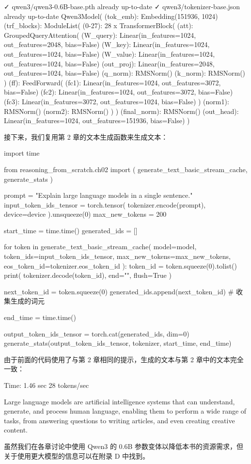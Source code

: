 \begin{codebox}
✓ qwen3/qwen3-0.6B-base.pth already up-to-date
✓ qwen3/tokenizer-base.json already up-to-date
Qwen3Model(
  (tok_emb): Embedding(151936, 1024)
  (trf_blocks): ModuleList(
    (0-27): 28 x TransformerBlock(
      (att): GroupedQueryAttention(
        (W_query): Linear(in_features=1024, out_features=2048, bias=False)
        (W_key): Linear(in_features=1024, out_features=1024, bias=False)
        (W_value): Linear(in_features=1024, out_features=1024, bias=False)
        (out_proj): Linear(in_features=2048, out_features=1024, bias=False)
        (q_norm): RMSNorm()
        (k_norm): RMSNorm()
      )
      (ff): FeedForward(
        (fc1): Linear(in_features=1024, out_features=3072, bias=False)
        (fc2): Linear(in_features=1024, out_features=3072, bias=False)
        (fc3): Linear(in_features=3072, out_features=1024, bias=False)
      )
      (norm1): RMSNorm()
      (norm2): RMSNorm()
    )
  )
  (final_norm): RMSNorm()
  (out_head): Linear(in_features=1024, out_features=151936, bias=False)
)
\end{codebox}

接下来，我们复用第 2 章的文本生成函数来生成文本：

\begin{codebox}
import time

from reasoning_from_scratch.ch02 import (
   generate_text_basic_stream_cache,
   generate_stats
)

prompt = "Explain large language models in a single sentence."
input_token_ids_tensor = torch.tensor(
    tokenizer.encode(prompt),
    device=device
    ).unsqueeze(0)
max_new_tokens = 200

start_time = time.time()
generated_ids = []

for token in generate_text_basic_stream_cache(
    model=model,
    token_ids=input_token_ids_tensor,
    max_new_tokens=max_new_tokens,
    eos_token_id=tokenizer.eos_token_id
):
    token_id = token.squeeze(0).tolist()
    print(
        tokenizer.decode(token_id),
        end="",
        flush=True
    )

    next_token_id = token.squeeze(0)
    generated_ids.append(next_token_id)  # 收集生成的词元

end_time = time.time()

output_token_ids_tensor = torch.cat(generated_ids, dim=0)
generate_stats(output_token_ids_tensor, tokenizer, start_time, end_time)
\end{codebox}

由于前面的代码使用了与第 2 章相同的提示，生成的文本与第 2 章中的文本完全一致：

\begin{codebox}
Time: 1.46 sec
28 tokens/sec

 Large language models are artificial intelligence systems that can
understand, generate, and process human language, enabling them to
perform a wide range of tasks, from answering questions to writing
articles, and even creating creative content.
\end{codebox}

虽然我们在各章讨论中使用 Qwen3 的 0.6B 参数变体以降低本书的资源需求，但关于使用更大模型的信息可以在附录 D 中找到。
